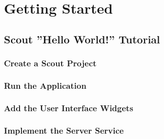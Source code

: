 \documentclass[a4paper,10pt,twoside]{book}
\begin{document}
\thispagestyle{empty}
\frontmatter




\pagestyle{plain}

\sloppy

\mainmatter


\pagestyle{headings}

\chapter*{Getting Started}

\section*{Scout ''Hello World!'' Tutorial}
\subsection*{Create a Scout Project}

\subsection*{Run the Application}

\subsection*{Add the User Interface Widgets}

\subsection*{Implement the Server Service}

\end{document}
